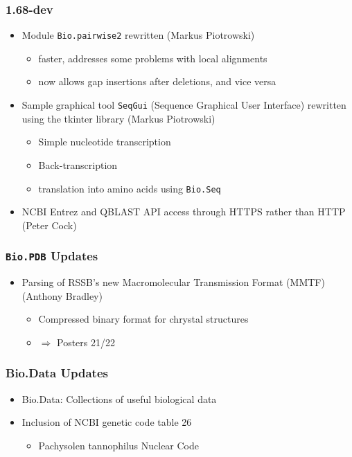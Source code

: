 \documentclass[trans]{beamer}
\begin{document}
\frame
{
  \frametitle{1.68-dev}

  \begin{itemize}
  \item Module \texttt{Bio.pairwise2} rewritten (Markus Piotrowski)
  \begin{itemize}
  \item faster, addresses some problems with local alignments
  \item now allows gap insertions after deletions, and vice versa
  \end{itemize}

  \item Sample graphical tool \texttt{SeqGui} (Sequence Graphical User Interface)
rewritten using the tkinter library (Markus Piotrowski)
  \begin{itemize}
  \item Simple nucleotide transcription
  \item Back-transcription
  \item translation into amino acids using \texttt{Bio.Seq}
  \end{itemize}

  \item NCBI Entrez and QBLAST API access through HTTPS rather than HTTP (Peter Cock)
  
  \end{itemize}
}

\frame
{
  \frametitle{\texttt{Bio.PDB} Updates}
  
  \begin{itemize}
  \item Parsing of RSSB's new Macromolecular Transmission Format (MMTF) (Anthony Bradley)
  \begin{itemize}
  \item Compressed binary format for chrystal structures
  \item $\Rightarrow$ Posters 21/22
  \end{itemize}
  \end{itemize}
  
  
}

\frame
{
  \frametitle{Bio.Data Updates}
  
  \begin{itemize}
  \item Bio.Data: Collections of useful biological data
  \item Inclusion of NCBI genetic code table 26
  \begin{itemize}
  \item Pachysolen tannophilus Nuclear Code
  \end{itemize}
  \end{itemize}
}
\end{document}
